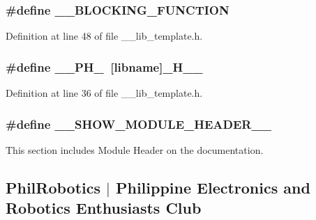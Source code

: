 \subsubsection[{\-\_\-\-\_\-\-B\-L\-O\-C\-K\-I\-N\-G\-\_\-\-F\-U\-N\-C\-T\-I\-O\-N}]{\setlength{\rightskip}{0pt plus 5cm}\#define \-\_\-\-\_\-\-B\-L\-O\-C\-K\-I\-N\-G\-\_\-\-F\-U\-N\-C\-T\-I\-O\-N}\label{____lib__template_8h_a5e71ff5923bf14eb62355703edcc90c2}


Definition at line 48 of file \-\_\-\-\_\-lib\-\_\-template.\-h.

\subsubsection[{\-\_\-\-\_\-\-P\-H\-\_\-}]{\setlength{\rightskip}{0pt plus 5cm}\#define \-\_\-\-\_\-\-P\-H\-\_\-~[libname]\-\_\-\-H\-\_\-\-\_\-}\label{____lib__template_8h_a5558e4961c902c9d89a041dadd84d43e}


Definition at line 36 of file \-\_\-\-\_\-lib\-\_\-template.\-h.

\subsubsection[{\-\_\-\-\_\-\-S\-H\-O\-W\-\_\-\-M\-O\-D\-U\-L\-E\-\_\-\-H\-E\-A\-D\-E\-R\-\_\-\-\_\-}]{\setlength{\rightskip}{0pt plus 5cm}\#define \-\_\-\-\_\-\-S\-H\-O\-W\-\_\-\-M\-O\-D\-U\-L\-E\-\_\-\-H\-E\-A\-D\-E\-R\-\_\-\-\_\-}\label{____lib__template_8h_aa61948e995c04179b19d5e2ad6f5ac9f}


This section includes Module Header on the documentation. 

\subsection*{Phil\-Robotics $|$ Philippine Electronics and Robotics Enthusiasts Club}

